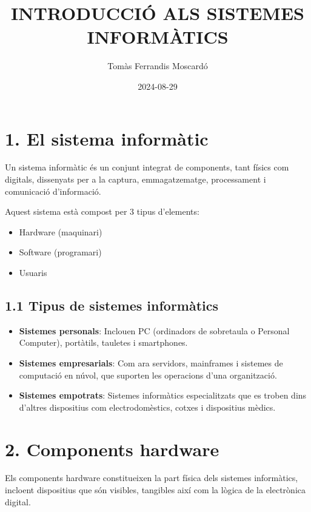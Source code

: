 \documentclass[
  12 pt,
  a4paper,
]{article}
\title{INTRODUCCIÓ ALS SISTEMES INFORMÀTICS}
\author{Tomàs Ferrandis Moscardó}
\date{2024-08-29}
\providecommand{\tightlist}{%
  \setlength{\itemsep}{0pt}\setlength{\parskip}{0pt}}
\begin{document}
\maketitle

{
\setcounter{tocdepth}{2}
\tableofcontents
}
\newpage
\renewcommand\tablename{Tabla}

\section{1. El sistema informàtic}\label{el-sistema-informuxe0tic}

Un sistema informàtic és un conjunt integrat de components, tant físics
com digitals, dissenyats per a la captura, emmagatzematge, processament
i comunicació d'informació.

Aquest sistema està compost per 3 tipus d'elements:

\begin{itemize}
\item
  Hardware (maquinari)
\item
  Software (programari)
\item
  Usuaris
\end{itemize}

\subsection{1.1 Tipus de sistemes
informàtics}\label{tipus-de-sistemes-informuxe0tics}

\begin{itemize}
\tightlist
\item
  \textbf{Sistemes personals}: Inclouen PC (ordinadors de sobretaula o
  Personal Computer), portàtils, tauletes i smartphones.
\item
  \textbf{Sistemes empresarials}: Com ara servidors, mainframes i
  sistemes de computació en núvol, que suporten les operacions d'una
  organització.
\item
  \textbf{Sistemes empotrats}: Sistemes informàtics especialitzats que
  es troben dins d'altres dispositius com electrodomèstics, cotxes i
  dispositius mèdics.
\end{itemize}

\section{2. Components hardware}\label{components-hardware}

Els components hardware constitueixen la part física dels sistemes
informàtics, incloent dispositius que són visibles, tangibles així com
la lògica de la electrònica digital.
\end{document}
